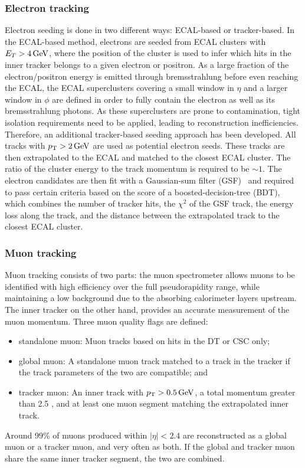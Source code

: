 \subsubsection{Electron tracking}
\label{subsub:objreco:electrontracking}
Electron seeding is done in two different ways: ECAL-based  or tracker-based. In the ECAL-based method, electrons are seeded from  ECAL clusters with $E_T > 4 \,\text{Ge\hspace{-.08em}V}$, where the position of the cluster is used to infer which hits in the inner tracker belongs to a given electron or positron. As a large fraction of the electron/positron energy is emitted through bremsstrahlung before even reaching the ECAL, the ECAL superclusters covering a small window in $\eta$ and a larger window in $\phi$ are defined in order to fully contain the electron as well as its bremsstrahlung photons. As these superclusters are prone to contamination, tight isolation requirements need to be applied, leading to reconstruction inefficiencies. Therefore, an additional tracker-based seeding approach has been developed. All tracks with $p_{\mathrm{T}}>2\,\text{Ge\hspace{-.08em}V}$ are used as potential electron seeds. These tracks are then extrapolated to the ECAL and matched to the closest ECAL cluster. The ratio of the cluster energy to the track momentum is required to be $\sim 1$. The electron candidates are then fit with a Gaussian-sum filter (GSF)~\cite{0954-3899-31-9-N01} and required to pass certain criteria based on the score of a boosted-decision-tree (BDT), which combines the number of tracker hits, the $\chi^2$ of the GSF track, the energy loss along the  track, and the distance between the extrapolated track to the closest ECAL cluster.

\subsubsection{Muon tracking}
\label{subsub:objreco:muontracking}
Muon tracking consists of two parts: the muon spectrometer allows muons to be identified with high efficiency over the full pseudorapidity range, while maintaining a low background due to the absorbing calorimeter layers upstream. The inner tracker on the other hand, provides an accurate measurement of the muon momentum. Three muon quality flags are defined:
\begin{itemize}
  \itemsep0em 
  \item standalone muon: Muon tracks based on hits in the DT or CSC only;
  \item global muon: A standalone muon track matched to a track in the tracker if the track parameters of the two are compatible; and
  \item tracker muon: An inner track with $p_{\mathrm{T}}> 0.5 \,\text{Ge\hspace{-.08em}V}$, a total momentum greater than 2.5 \GeV, and at least one muon segment matching the extrapolated inner track.
\end{itemize}
Around 99\% of muons produced within $|\eta|<2.4$ are reconstructed as a global muon or a tracker muon, and very often as both. If the global and tracker muon share the same inner tracker segment, the two are combined.

